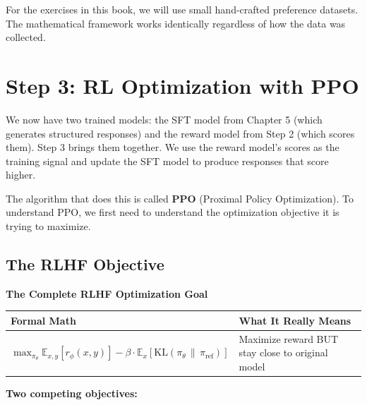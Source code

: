 \begin{chapterenv}
For the exercises in this book, we will use small hand-crafted preference datasets. The mathematical framework works identically regardless of how the data was collected.

\section{Step 3: RL Optimization with PPO}

We now have two trained models: the SFT model from Chapter 5 (which generates structured responses) and the reward model from Step 2 (which scores them). Step 3 brings them together. We use the reward model's scores as the training signal and update the SFT model to produce responses that score higher.

The algorithm that does this is called \textbf{PPO} (Proximal Policy Optimization). To understand PPO, we first need to understand the optimization objective it is trying to maximize.

\subsection{The RLHF Objective}

\begin{infobox}
\textbf{The Complete RLHF Optimization Goal}

\begin{center}
\begin{tabular}{p{}p{}}
\toprule
\textbf{Formal Math} & \textbf{What It Really Means} \\
\midrule
$\max_{\pi_\theta} \mathbb{E}_{x,y}\!\left[r_\phi(x,y)\right] - \beta \cdot \mathbb{E}_x\!\left[\text{KL}(\pi_\theta \,\|\, \pi_{\text{ref}})\right]$ & Maximize reward BUT stay close to original model \\
\bottomrule
\end{tabular}
\end{center}

\textbf{Two competing objectives:}


\end{infobox}
\end{chapterenv}
